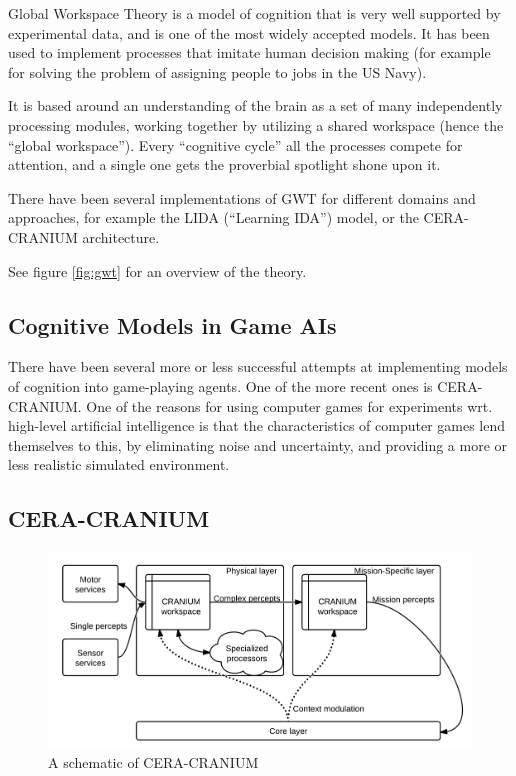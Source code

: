 Global Workspace Theory is a model of cognition that is very well supported by
experimental data, and is one of the most widely accepted
models.\cite{dehaene2001towards} It has been used to implement processes that
imitate human decision making (for example for solving the problem of assigning
people to jobs in the US Navy).\cite{baars2005gwt}\cite{franklin2003interacting}

It is based around an understanding of the brain as a set of many independently
processing modules, working together by utilizing a shared workspace (hence the
``global workspace''). Every ``cognitive cycle'' all the
processes compete for attention, and a single one gets the
proverbial spotlight shone upon it.\cite{baars2005gwt}

There have been several implementations of GWT for different domains and
approaches, for example the LIDA (``Learning IDA'')
model\cite{franklin2007lida}, or the CERA-CRANIUM
architecture\cite{arrabales2009ceracranium}.

See figure \ref{fig:gwt} for an overview of the theory.

\subsection{Cognitive Models in Game AIs}
There have been several more or less successful attempts at implementing models
of cognition into game-playing agents. One of the more recent ones is
CERA-CRANIUM. One of the reasons for using computer games for experiments wrt.
high-level artificial intelligence is that the characteristics of computer
games lend themselves to this, by eliminating noise and uncertainty, and
providing a more or less realistic simulated environment.


\subsection{CERA-CRANIUM}
\begin{figure}[h!tb]
\centering
\includegraphics[scale=1.0]{graphics/ceracranium.png}
\caption{A schematic of CERA-CRANIUM\cite{arrabales2009ceracranium}}
\label{fig:ceracranium}
\end{figure}

